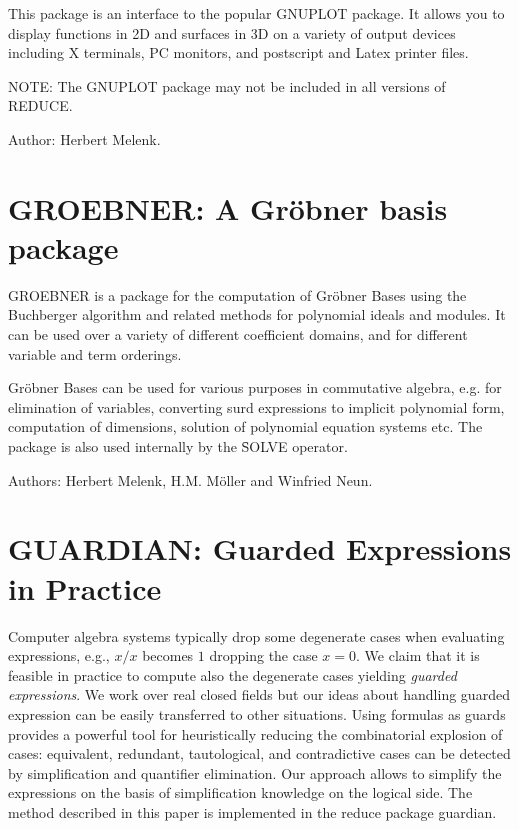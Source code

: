 This package is an interface to the popular GNUPLOT package.
It allows you to display functions in 2D and surfaces in 3D
on a variety of output devices including X terminals, PC monitors, and
postscript and Latex printer files.

NOTE: The GNUPLOT package may not be included in all versions of REDUCE.

Author: Herbert Melenk.



\newpage

\section{GROEBNER: A Gr\"{o}bner basis package} 
\label{GROEBNER}

GROEBNER is a package for the computation of Gr\"obner
Bases using the Buchberger algorithm and related methods
for polynomial ideals and modules.  It can be used over a variety of
different coefficient domains, and for different variable and term
orderings.

Gr\"obner Bases can be used for various purposes in commutative
algebra, e.g. for elimination of variables,
converting surd expressions to implicit polynomial form,
computation of dimensions, solution of polynomial equation systems 
 etc. 
The package is also used internally by the \f{SOLVE}
operator.

Authors: Herbert Melenk, H.M. M\"oller and Winfried Neun.



\newpage

\section{GUARDIAN: Guarded Expressions in Practice}
\label{GUARDIAN}

Computer algebra systems typically drop some degenerate cases when
evaluating expressions, e.g., $x/x$ becomes $1$ dropping the case
$x=0$. We claim that it is feasible in practice to compute also the
degenerate cases yielding {\em guarded expressions}. We work over real
closed fields but our ideas about handling guarded expression can be
easily transferred to other situations. Using formulas as guards
provides a powerful tool for heuristically reducing the combinatorial
explosion of cases: equivalent, redundant, tautological, and
contradictive cases can be detected by simplification and quantifier
elimination. Our approach allows to simplify the expressions on the
basis of simplification knowledge on the logical side. The method
described in this paper is implemented in the {\sc reduce} package
{\sc guardian}.

